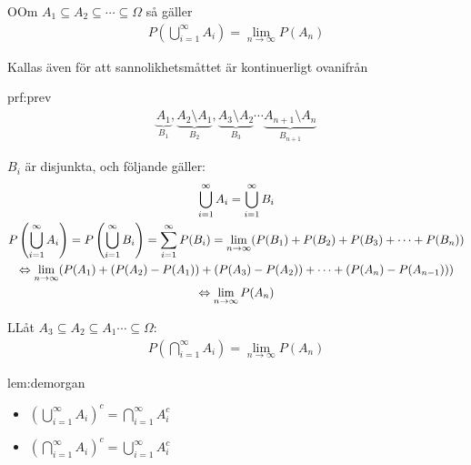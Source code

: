 \begin{theo}
  OOm $A_1\subseteq A_2\subseteq\cdots\subseteq\Omega$ så gäller
  \begin{equation*}
    \begin{gathered}
      P(\bigcup_{i=1}^{\infty}A_i) = \lim_{n\to\infty}P(A_n)
    \end{gathered}
  \end{equation*}
  \par\bigskip
  \noindent Kallas även för att sannolikhetsmåttet är kontinuerligt ovanifrån
\end{theo}
\par\bigskip
\begin{prf}{prf:prev}
  \begin{equation*}
    \begin{gathered}
      \underbrace{A_1}_{\text{$B_1$}}, \underbrace{A_2\setminus A_1}_{\text{$B_2$}},\underbrace{A_3\setminus A_2}_{\text{$B_3$}}\cdots \underbrace{A_{n+1}\setminus A_n}_{\text{$B_{n+1}$}}
    \end{gathered}
  \end{equation*}
  \par\bigskip
  \noindent $B_i$ är disjunkta, och följande gäller:
  \begin{equation*}
    \begin{gathered}
      \bigcup_{i=1}^{\infty}A_i = \bigcup_{i=1}^{\infty}B_i\\
      P\left(\bigcup_{i=1}^{\infty}A_i\right) = P\left(\bigcup_{i=1}^{\infty}B_i\right) = \sum_{i=1}^{\infty}P(B_i) = \lim_{n\to\infty}(P(B_1)+P(B_2)+P(B_3)+\cdots+P(B_n))\\
      \Leftrightarrow \lim_{n\to\infty}(P(A_1)+(P(A_2)-P(A_1))+(P(A_3)-P(A_2))+\cdots+(P(A_n)-P(A_{n-1})))\\
      \Leftrightarrow\lim_{n\to\infty}P(A_n)
    \end{gathered}
  \end{equation*}
\end{prf}
\newpage
\begin{theo}
  LLåt $A_3\subseteq A_2\subseteq A_1\cdots\subseteq\Omega$:
  \begin{equation*}
    \begin{gathered}
      P\left(\bigcap_{i=1}^{\infty}A_i\right) = \lim_{n\to\infty}P(A_n)
    \end{gathered}
  \end{equation*}
\end{theo}
\par\bigskip
\begin{lem}{lem:demorgan}
  \begin{itemize}
    \item $\left(\bigcup_{i=1}^{\infty}A_i\right)^c = \bigcap_{i=1}^{\infty}A_i^c$
    \item $\left(\bigcap_{i=1}^{\infty}A_i\right)^c=\bigcup_{i=1}^{\infty}A_i^c$
  \end{itemize}
\end{lem}
